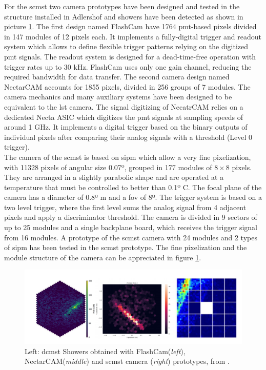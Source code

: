 \documentclass[main.tex]{subfiles}
\begin{document}
For the \gls{scmst} two camera prototypes have been designed and tested in the structure installed in Adlershof and showers have been detected as shown in picture \ref{fig:MSTcamerasimg}.
The first design named FlashCam have 1764 \gls{pmt}-based pixels divided in 147 modules of 12 pixels each. It implements a fully-digital trigger and readout system which allows to define flexible trigger patterns relying on the digitized \gls{pmt} signals. The readout system is designed for a dead-time-free operation with trigger rates up to 30 kHz. FlashCam uses only one gain channel, reducing the required bandwidth for data transfer. 
The second camera design named NectarCAM accounts for 1855 pixels, divided in 256 groups of 7 modules. The camera mechanics and many auxiliary systems have been designed to be equivalent to the \gls{lst} camera. The signal digitizing of NecatrCAM relies on a dedicated Necta ASIC which digitizes the \gls{pmt} signals at sampling speeds of around 1 GHz. It implements a digital trigger based on the binary outputs of individual pixels after comparing their analog signals with a threshold (Level 0 trigger).\\
The camera of the \gls{scmst} is based on \gls{sipm} which allow a very fine pixelization, with 11328 pixels of angular size 0.07º, grouped in 177 modules of $8\times8$ pixels. They are arranged in a slightly parabolic shape and are operated at a temperature that must be controlled to better than 0.1º C. The focal plane of the camera has a diameter of 0.8º m and a \gls{fov} of 8º. The trigger system is based on a two level trigger, where the first level sums the analog signal from 4 adjacent pixels and apply a discriminator threshold. The camera is divided in 9 sectors of up to 25 modules and a single backplane board, which receives the trigger signal from 16 modules. A prototype of the \gls{scmst} camera with 24 modules and 2 types of \gls{sipm} has been tested in the \gls{scmst} prototype. The fine pixelization and the module structure of the camera can be appreciated in figure \ref{fig:MSTcamerasimg}. 

\begin{figure}
\centering
 \includegraphics[width=\textwidth]{Pictures/showerimagesMST.pdf}
  \caption{Left: \gls{dcmst} Showers obtained with FlashCam(\textit{left}), NectarCAM(\textit{middle}) and \gls{scmst} camera (\textit{right}) prototypes, from \cite{2019MSTreport}.}
    \label{fig:MSTcamerasimg}
\end{figure}
\end{document}

